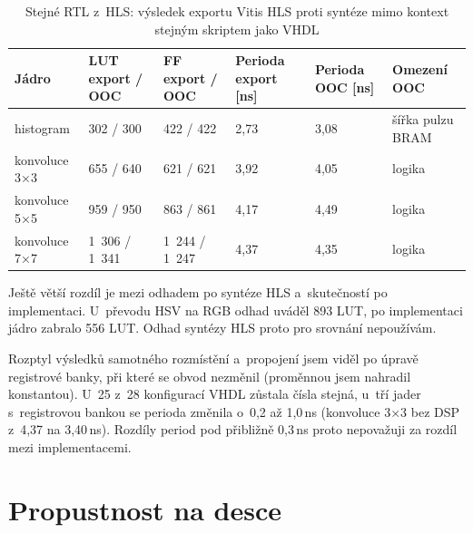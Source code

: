 

\begin{table}[htbp]
    \centering
    \caption{Stejné RTL z~HLS: výsledek exportu Vitis HLS proti syntéze mimo kontext stejným skriptem jako VHDL}
    \label{tab:exportooc}
    \begin{tabular}{p{3.0cm}p{2.4cm}p{2.4cm}p{1.9cm}p{1.9cm}p{2.8cm}}
        \toprule
        Jádro & LUT export / OOC & FF export / OOC & Perioda export [ns] & Perioda OOC [ns] & Omezení OOC \\
        \midrule
        histogram & 302 / 300 & 422 / 422 & 2,73 & 3,08 & šířka pulzu BRAM \\
        konvoluce 3×3 & 655 / 640 & 621 / 621 & 3,92 & 4,05 & logika \\
        konvoluce 5×5 & 959 / 950 & 863 / 861 & 4,17 & 4,49 & logika \\
        konvoluce 7×7 & 1 306 / 1 341 & 1 244 / 1 247 & 4,37 & 4,35 & logika \\
        \bottomrule
    \end{tabular}
\end{table}


Ještě větší rozdíl je mezi odhadem po syntéze HLS a~skutečností po implementaci. U~převodu HSV na RGB odhad uváděl 893 LUT, po implementaci jádro zabralo 556 LUT. Odhad syntézy HLS proto pro srovnání nepoužívám.

Rozptyl výsledků samotného rozmístění a~propojení jsem viděl po úpravě registrové banky, při které se obvod nezměnil (proměnnou jsem nahradil konstantou). U~25 z~28 konfigurací VHDL zůstala čísla stejná, u~tří jader s~registrovou bankou se perioda změnila o~0,2 až 1,0\,ns (konvoluce 3×3 bez DSP z~4,37 na 3,40\,ns). Rozdíly period pod přibližně 0,3\,ns proto nepovažuji za rozdíl mezi implementacemi.

\section{Propustnost na desce}
\label{sec:vdeska}

